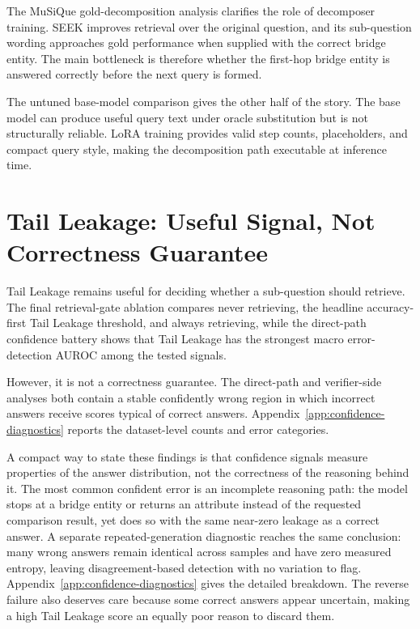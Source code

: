 \documentclass{nthu_thesis}
\begin{document}
\begin{thesiscjk}
The MuSiQue gold-decomposition analysis clarifies the role of decomposer training. SEEK improves retrieval over the original question, and its sub-question wording approaches gold performance when supplied with the correct bridge entity. The main bottleneck is therefore whether the first-hop bridge entity is answered correctly before the next query is formed.

The untuned base-model comparison gives the other half of the story. The base model can produce useful query text under oracle substitution but is not structurally reliable. LoRA training provides valid step counts, placeholders, and compact query style, making the decomposition path executable at inference time.

\section{Tail Leakage: Useful Signal, Not Correctness Guarantee}
\label{sec:gate-design}

Tail Leakage remains useful for deciding whether a sub-question should retrieve. The final retrieval-gate ablation compares never retrieving, the headline accuracy-first Tail Leakage threshold, and always retrieving, while the direct-path confidence battery shows that Tail Leakage has the strongest macro error-detection AUROC among the tested signals.

However, it is not a correctness guarantee. The direct-path and verifier-side analyses both contain a stable confidently wrong region in which incorrect answers receive scores typical of correct answers. Appendix~\ref{app:confidence-diagnostics} reports the dataset-level counts and error categories.

A compact way to state these findings is that confidence signals measure properties of the answer distribution, not the correctness of the reasoning behind it. The most common confident error is an incomplete reasoning path: the model stops at a bridge entity or returns an attribute instead of the requested comparison result, yet does so with the same near-zero leakage as a correct answer. A separate repeated-generation diagnostic reaches the same conclusion: many wrong answers remain identical across samples and have zero measured entropy, leaving disagreement-based detection with no variation to flag. Appendix~\ref{app:confidence-diagnostics} gives the detailed breakdown. The reverse failure also deserves care because some correct answers appear uncertain, making a high Tail Leakage score an equally poor reason to discard them.


\end{thesiscjk}
\end{document}

